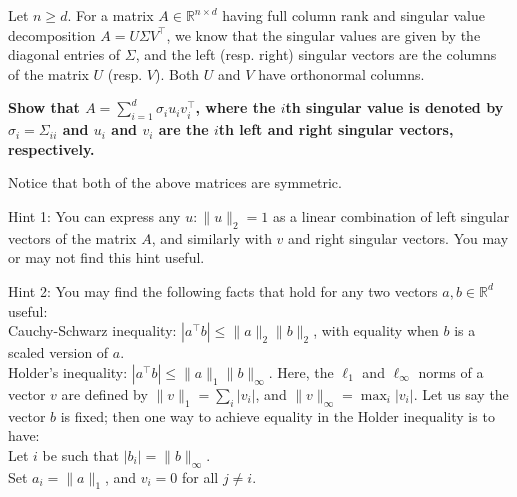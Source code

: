 \begin{Parts}
\Part Let $n \geq d$. For a matrix $A \in \mathbb{R}^{n \times d}$ having full column rank and singular value decomposition $A = U \Sigma V^\top$, we know that the singular values are given by the diagonal entries of $\Sigma$, and the left (resp. right) singular vectors are the columns of the matrix $U$ (resp. $V$). Both $U$ and $V$ have orthonormal columns.

{\bf Show that $A = \sum_{i=1}^d \sigma_i u_i v_i^\top$, where the $i$th singular value is denoted by $\sigma_i = \Sigma_{ii}$ and $u_i$ and $v_i$ are the $i$th left and right singular vectors, respectively.}




Notice that both of the above matrices are symmetric.






Hint 1: You can express any $u: \|u \|_2 = 1$ as a linear combination of left singular vectors of the matrix $A$, and similarly with $v$ and right singular vectors. You may or may not find this hint useful.

Hint 2: You may find the following facts that hold for any two vectors $a, b \in \mathbb{R}^d$ useful: \\
Cauchy-Schwarz inequality: $|a^\top b| \leq \|a\|_2 \|b\|_2$, with equality when $b$ is a scaled version of $a$. \\
Holder's inequality: $|a^\top b| \leq \| a\|_1 \|b\|_\infty$. Here, the $\ell_1$ and $\ell_\infty$ norms of a vector $v$ are defined by $\|v\|_1 = \sum_i |v_i|$, and $\|v\|_\infty = \max_i |v_i|$. Let us say the vector $b$ is fixed; then one way to achieve equality in the Holder inequality is to have: \\
Let $i$ be such that $|b_i| = \|b\|_\infty$. \\
Set $a_i = \|a\|_1$, and $v_i = 0$ for all $j \neq i$.





\end{Parts}
